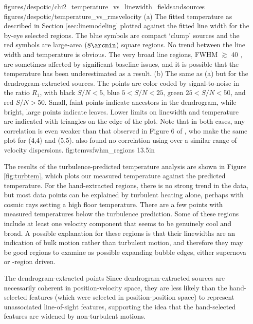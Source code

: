 \FigureTwo
{figures/despotic/chi2_temperature_vs_linewidth_fieldsandsources} %
{figures/despotic/temperature_vs_rmsvelocity} %
{(a) 
The fitted temperature as described in Section \ref{sec:linemodeling} plotted
against the fitted line width for the by-eye selected regions.  The blue
symbols are compact `clump' sources and the red symbols are large-area
($8\arcmin$) square regions.  No trend between the line width and temperature
is obvious.  The very broad line regions, FWHM $\gtrsim$ 40 \kms, are sometimes
affected by significant baseline issues, and it is possible that the
temperature has been
underestimated as a result.
(b) The same as (a) but for the dendrogram-extracted sources. The points are
color coded by signal-to-noise in the ratio $R_1$, with black $S/N < 5$, blue
$5 < S/N < 25$, green $25 < S/N < 50$, and red $S/N > 50$.  Small, faint points
indicate ancestors in the dendrogram, while bright, large points indicate leaves.
Lower limits on linewidth and temperature are indicated with triangles on the
edge of the plot.  
Note that in both cases, any correlation is even weaker than that observed in
Figure 6 of \citet{Huettemeister1993a}, who make the same plot for \ammonia (4,4)
and (5,5).  \citet{Riquelme2013a} also found no correlation using \ammonia over a similar
range of velocity dispersions.
}
{fig:temvsfwhm_regions}
{1}{3.5in}

The results of the turbulence-predicted temperature analysis are shown in 
Figure \ref{fig:turbtem}, which plots our measured temperature against
the predicted temperature.  For the hand-extracted regions, there is no
strong trend in the data, but most data points can be explained by turbulent
heating alone, perhaps with cosmic rays setting a high floor temperature.
There are a few points with measured temperatures below the turbulence
prediction.  Some of these regions
include at least one velocity component that seems
to be genuinely cool and broad.  A possible explanation for these
regions is that their linewidths are an indication of bulk motion rather than
turbulent motion, and therefore they may be good regions to examine as possible
expanding bubble edges, either supernova or \hii-region driven.

The dendrogram-extracted points   Since dendrogram-extracted
sources are necessarily coherent in position-velocity space, they are less likely
than the hand-selected features (which were selected in position-position space)
to represent unassociated line-of-sight features, supporting the idea that the
hand-selected features are widened by non-turbulent motions.


